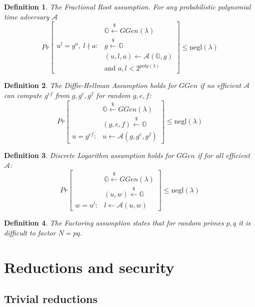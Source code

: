 \documentclass[a4paper]{article}
\newtheorem{definition}{Definition}
\begin{document}
\begin{definition}
The \emph{Fractional Root assumption}. For any probabilistic polynomial time adversary $\mathcal{A}$ 
$$
Pr
\begin{bmatrix}
&\mathbb{G}\xleftarrow{\$}GGen(\lambda)\\
u^l = g^{a},\;l \nmid a : & g \xleftarrow{\$}\mathbb{G}\\
& (u,l,a) \xleftarrow{} \mathcal{A}(\mathbb{G},g)\\
& \text{and }a,l<2^{poly(\lambda)}
\end{bmatrix}\leq \mathrm{negl}(\lambda)
$$

\end{definition}

\begin{definition}
The \emph{Diffie-Hellman Assumption} holds for
$GGen$ if no efficient $\mathcal{A}$ can compute $g^{ef}$ from $g,g^e,g^f$ for random $g,e,f$:
$$
Pr
\begin{bmatrix}
&\mathbb{G}\xleftarrow{\$}GGen(\lambda)\\
& (g,e,f)\xleftarrow{\$}\mathbb{G}\\
u = g^{ef} :& u \xleftarrow{} \mathcal{A}(g,g^e,g^f)
\end{bmatrix}\leq \mathrm{negl}(\lambda)
$$
\end{definition}

\begin{definition}
\emph{Discrete Logarithm} assumption 
holds for
$GGen$ if for all efficient $\mathcal{A}$:
$$
Pr
\begin{bmatrix}
&\mathbb{G}\xleftarrow{\$}GGen(\lambda)\\
& (u,w)\xleftarrow{\$}\mathbb{G}\\
w = u^l :& l \xleftarrow{} \mathcal{A}(u,w)
\end{bmatrix}\leq \mathrm{negl}(\lambda)
$$
\end{definition}

\begin{definition}
The \emph{Factoring} assumption states that for random  primes $p,q$ it is difficult to factor $N=pq$.
\end{definition}


\section{Reductions and security}

\subsection{Trivial reductions}
\end{document}
